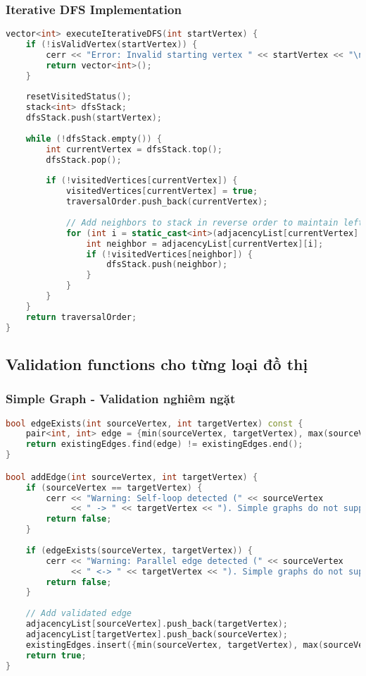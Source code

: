 \documentclass[12pt]{article}
\begin{document}
\subsubsection*{Iterative DFS Implementation}
\begin{lstlisting}[language=C++, basicstyle=\ttfamily\footnotesize, frame=single]
vector<int> executeIterativeDFS(int startVertex) {
    if (!isValidVertex(startVertex)) {
        cerr << "Error: Invalid starting vertex " << startVertex << "\n";
        return vector<int>();
    }
    
    resetVisitedStatus();
    stack<int> dfsStack;
    dfsStack.push(startVertex);
    
    while (!dfsStack.empty()) {
        int currentVertex = dfsStack.top();
        dfsStack.pop();
        
        if (!visitedVertices[currentVertex]) {
            visitedVertices[currentVertex] = true;
            traversalOrder.push_back(currentVertex);
            
            // Add neighbors to stack in reverse order to maintain left-to-right traversal
            for (int i = static_cast<int>(adjacencyList[currentVertex].size()) - 1; i >= 0; --i) {
                int neighbor = adjacencyList[currentVertex][i];
                if (!visitedVertices[neighbor]) {
                    dfsStack.push(neighbor);
                }
            }
        }
    }
    return traversalOrder;
}
\end{lstlisting}

\subsection*{Validation functions cho từng loại đồ thị}

\subsubsection*{Simple Graph - Validation nghiêm ngặt}
\begin{lstlisting}[language=C++, basicstyle=\ttfamily\footnotesize, frame=single]
bool edgeExists(int sourceVertex, int targetVertex) const {
    pair<int, int> edge = {min(sourceVertex, targetVertex), max(sourceVertex, targetVertex)};
    return existingEdges.find(edge) != existingEdges.end();
}

bool addEdge(int sourceVertex, int targetVertex) {
    if (sourceVertex == targetVertex) {
        cerr << "Warning: Self-loop detected (" << sourceVertex 
             << " -> " << targetVertex << "). Simple graphs do not support self-loops.\n";
        return false;
    }
    
    if (edgeExists(sourceVertex, targetVertex)) {
        cerr << "Warning: Parallel edge detected (" << sourceVertex 
             << " <-> " << targetVertex << "). Simple graphs do not support parallel edges.\n";
        return false;
    }
    
    // Add validated edge
    adjacencyList[sourceVertex].push_back(targetVertex);
    adjacencyList[targetVertex].push_back(sourceVertex);
    existingEdges.insert({min(sourceVertex, targetVertex), max(sourceVertex, targetVertex)});
    return true;
}
\end{lstlisting}
\end{document}
